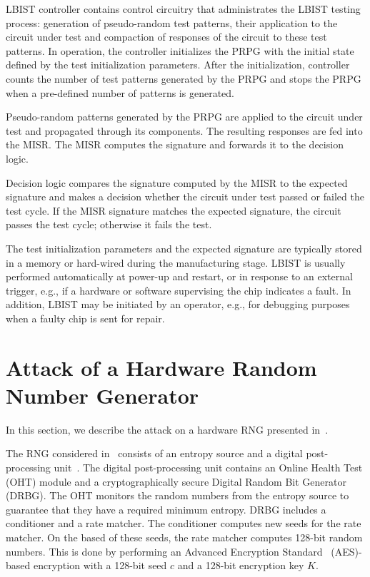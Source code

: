 \documentclass[a4paper]{llncs}
\begin{document}
LBIST controller contains control circuitry that administrates the LBIST testing process: generation of pseudo-random test patterns, their application to the circuit under test and compaction of responses of the circuit to these test patterns. In operation, the controller initializes the PRPG with the initial state defined by the test initialization parameters. After the initialization, controller counts the number of test patterns generated by the  
PRPG and stops the PRPG when a pre-defined number of patterns is generated. 

Pseudo-random patterns generated by the PRPG are applied to the circuit under test and propagated through its components. The resulting responses are fed into the MISR. The MISR computes the signature and forwards it to the decision logic.

Decision logic compares the signature computed by the MISR to the expected signature and makes a decision whether the circuit under test passed or failed the test cycle. If the MISR signature matches the expected signature, the circuit passes the test cycle; otherwise it fails the test.  

The test initialization parameters and the expected signature are typically stored in a memory or hard-wired during the manufacturing stage. LBIST is usually performed automatically at power-up and restart, or in response to an external trigger, e.g., if a hardware or software supervising the chip indicates a fault. In addition, LBIST may be initiated by an operator, e.g., for debugging purposes when a faulty chip is sent for repair.


\section{Attack of a Hardware Random Number Generator} \label{intel}

In this section, we describe the attack on a hardware RNG presented in~\cite{BeRPB13}. 

The RNG considered in~\cite{BeRPB13} consists of an entropy source and a digital post-processing unit~\cite{intel}.
The digital post-processing unit contains an Online Health Test (OHT) module and a cryptographically secure Digital Random Bit Generator (DRBG). The OHT monitors the random numbers from the entropy source to guarantee that they have a required minimum entropy. DRBG includes a conditioner and a rate matcher. The conditioner computes new seeds for the rate matcher. On the based of these seeds, the rate matcher computes 128-bit random numbers. This is done  by performing an Advanced Encryption Standard~\cite{aes} (AES)-based encryption with a 128-bit seed $c$ and a 128-bit encryption key $K$. 
\end{document}
